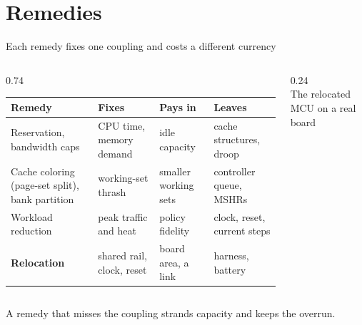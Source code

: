\documentclass[aspectratio=169, 12pt]{beamer}
\begin{document}
\section{Remedies}

\begin{frame}{Each remedy fixes one coupling and costs a different currency}
  \begin{columns}[c]
    \begin{column}{0.74\textwidth}
      \footnotesize
      \begin{tabular}{@{}>{\raggedright\arraybackslash}p{2.3cm}>{\raggedright\arraybackslash}p{2.4cm}>{\raggedright\arraybackslash}p{2.2cm}>{\raggedright\arraybackslash}p{2.4cm}@{}}\toprule
        \textbf{Remedy} & \textbf{Fixes} & \textbf{Pays in} & \textbf{Leaves}\\\midrule
        Reservation, bandwidth caps & CPU time, memory demand & idle capacity & cache structures, droop\\\addlinespace[0.05cm]
        Cache coloring (page-set split), bank partition & working-set thrash & smaller working sets & controller queue, MSHRs\\\addlinespace[0.05cm]
        Workload reduction & peak traffic and heat & policy fidelity & clock, reset, current steps\\\addlinespace[0.05cm]
        \textbf{Relocation} & shared rail, clock, reset & board area, a link & harness, battery\\\bottomrule
      \end{tabular}
    \end{column}
    \begin{column}{0.24\textwidth}
      \centering{}\\[0.05cm]
      {\footnotesize The relocated MCU on a real board}
    \end{column}
  \end{columns}
  \vspace{0.1cm}
  {\small A remedy that misses the coupling strands capacity and keeps the overrun.}\\[0.1cm]
\end{frame}
\end{document}
